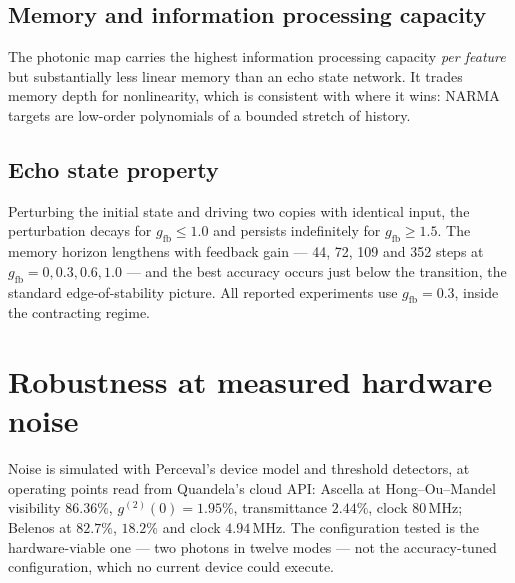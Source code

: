 \documentclass[11pt]{article}
\begin{document}
\subsection{Memory and information processing capacity}\label{sec:ipc}

\begin{table}[H]\centering
  \PaperTableMemory
  \caption{Linear memory capacity \citep{jaeger2001esn} and information processing capacity
           \citep{dambre2012ipc} on i.i.d.\ uniform input, mean over 3 seeds.}
  \label{tab:memory}
\end{table}

The photonic map carries the highest information processing capacity \emph{per feature} but
substantially less linear memory than an echo state network. It trades memory depth for
nonlinearity, which is consistent with where it wins: NARMA targets are low-order polynomials
of a bounded stretch of history.

\subsection{Echo state property}\label{sec:esp}

Perturbing the initial state and driving two copies with identical input, the perturbation
decays for $g_{\text{fb}} \le 1.0$ and persists indefinitely for $g_{\text{fb}} \ge 1.5$. The
memory horizon lengthens with feedback gain --- 44, 72, 109 and 352 steps at
$g_{\text{fb}} = 0, 0.3, 0.6, 1.0$ --- and the best accuracy occurs just below the transition,
the standard edge-of-stability picture. All reported experiments use $g_{\text{fb}} = 0.3$,
inside the contracting regime.

\section{Robustness at measured hardware noise}\label{sec:noise}

Noise is simulated with Perceval's device model and threshold detectors, at operating points
read from Quandela's cloud API: Ascella at Hong--Ou--Mandel visibility $86.36\%$,
$g^{(2)}(0) = 1.95\%$, transmittance $2.44\%$, clock $80$\,MHz; Belenos at $82.7\%$, $18.2\%$
and clock $4.94$\,MHz. The configuration tested is the hardware-viable one --- two photons in
twelve modes --- not the accuracy-tuned configuration, which no current device could execute.

\begin{table}[H]\centering
  \PaperTableNoise
  \caption{Sensitivity to finite sampling (left), photon indistinguishability (centre) and
           multi-photon emission (right), NARMA-10.}
  \label{tab:noise}
\end{table}
\end{document}
